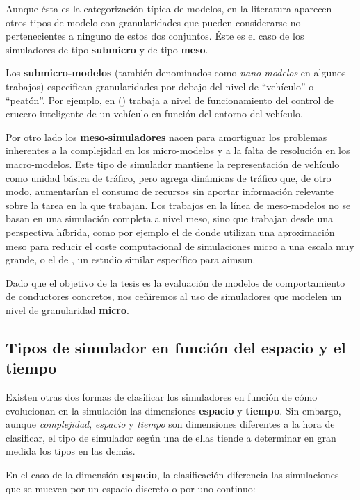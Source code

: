 Aunque ésta es la categorización típica de modelos, en la literatura aparecen otros tipos de modelo con granularidades que pueden considerarse no pertenecientes a ninguno de estos dos conjuntos. Éste es el caso de los simuladores de tipo \textbf{submicro} y de tipo \textbf{meso}.

Los \textbf{submicro-modelos} (también denominados como \textit{nano-modelos} en algunos trabajos) especifican granularidades por debajo del nivel de \enquote{vehículo} o \enquote{peatón}. Por ejemplo, en (\cite{Minderhoud1999}) trabaja a nivel de funcionamiento del control de crucero inteligente de un vehículo en función del entorno del vehículo.

Por otro lado los \textbf{meso-simuladores} nacen para amortiguar los problemas inherentes a la complejidad en los micro-modelos y a la falta de resolución en los macro-modelos. Este tipo de simulador mantiene la representación de vehículo como unidad básica de tráfico, pero agrega dinámicas de tráfico que, de otro modo, aumentarían el consumo de recursos sin aportar información relevante sobre la tarea en la que trabajan. Los trabajos en la línea de meso-modelos no se basan en una simulación completa a nivel meso, sino que trabajan desde una perspectiva híbrida, como por ejemplo el de \cite{munoz2001integrated} donde utilizan una aproximación meso para reducir el coste computacional de simulaciones micro a una escala muy grande, o el de \cite{casas2011need}, un estudio similar específico para \gls{aimsun}.

Dado que el objetivo de la tesis es la evaluación de modelos de comportamiento de conductores concretos, nos ceñiremos al uso de simuladores que modelen un nivel de granularidad \textbf{micro}.

\subsection{Tipos de simulador en función del espacio y el tiempo}

Existen otras dos formas de clasificar los simuladores en función de cómo evolucionan en la simulación las dimensiones \textbf{espacio} y  \textbf{tiempo}. Sin embargo, aunque \textit{complejidad}, \textit{espacio} y \textit{tiempo} son dimensiones diferentes a la hora de clasificar, el tipo de simulador según una de ellas tiende a determinar en gran medida los tipos en las demás.

En el caso de la dimensión \textbf{espacio}, la clasificación diferencia las simulaciones que se mueven por un espacio discreto o por uno continuo:

